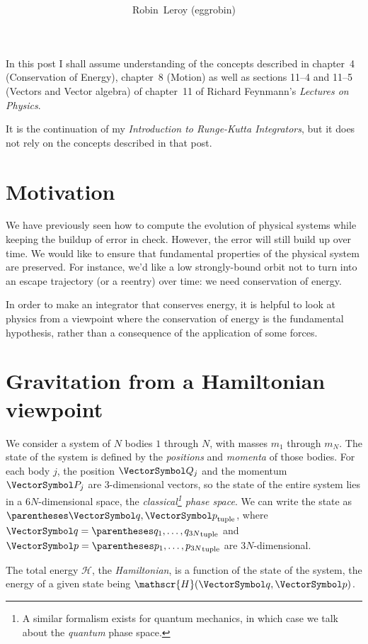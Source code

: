 \documentclass[10pt, a4paper, twoside]{basestyle}
\title{%
\textdisplay{%
A Short Introduction to Hamiltonian Mechanics}%
}
\author{Robin~Leroy (eggrobin)}
\begin{document}
\maketitle
In this post I shall assume understanding of the concepts described in
chapter~4 (Conservation of Energy), chapter~8 (Motion) as well as sections
11--4 and 11--5 (Vectors and Vector algebra) of chapter~11 of Richard
Feynmann's \emph{Lectures on Physics}.

It is the continuation of my \emph{Introduction to Runge-Kutta Integrators},
but it does not rely on the concepts described in that post.

\section{Motivation}
We have previously seen how to compute the evolution of physical systems while
keeping the buildup of error in check. However, the error will still build up
over time. We would like to ensure that fundamental properties of the physical
system are preserved. For instance, we'd like a low strongly-bound orbit not to
turn into an escape trajectory (or a reentry) over time: we need conservation
of energy.

In order to make an integrator that conserves energy, it is helpful to look at
physics from a viewpoint where the conservation of energy is the fundamental
hypothesis, rather than a consequence of the application of some forces.

\newcommand{\Hamiltonian}{\mathscr{H}}
\section{Gravitation from a Hamiltonian viewpoint}
We consider a system of $N$ bodies $1$ through $N$, with masses $m_1$ through
$m_N$. The state of the system is defined by the \emph{positions} and
\emph{momenta} of those bodies. For each body $j$, the position $\vQ_j$ and the
momentum $\vP_j$ are 3-dimensional vectors, so the state of the entire system
lies in a $6N$-dimensional space, the \emph{classical\footnote{A similar
formalism exists for quantum mechanics, in which case we talk about the
\emph{quantum} phase space.} phase space}.
We can write the state as $\tuple{\vq, \vp}$, where $\vq = \tuple{q_1, \dotsc,
q_{3N}}$ and $\vp =  \tuple{p_1, \dotsc, p_{3N}}$ are $3N$-dimensional.

The total energy $\Hamiltonian$, the \emph{Hamiltonian}, is a function
of the state of the system, the energy of a given state being $\Hamiltonian(\vq,
\vp)$.
\end{document}
